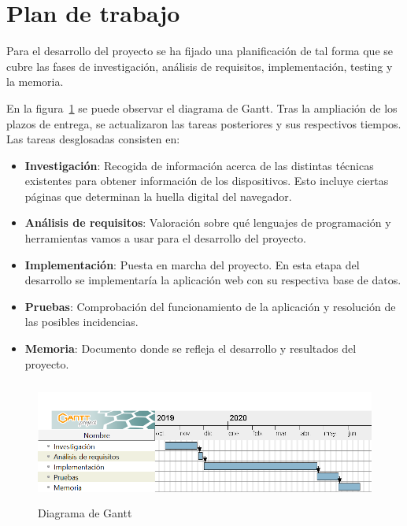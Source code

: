 \section{Plan de trabajo}
Para el desarrollo del proyecto se ha fijado una planificación de tal forma que se cubre las fases de investigación, análisis de requisitos, implementación, testing y la memoria.\par
En la figura~\ref{fig:diagramaGantt} se puede observar el diagrama de Gantt. Tras la ampliación de los plazos de entrega, se actualizaron las tareas posteriores y sus respectivos tiempos. Las tareas desglosadas consisten en:
\begin{itemize}
    \item \textbf{Investigación}: Recogida de información acerca de las distintas técnicas existentes para obtener información de los dispositivos. Esto incluye ciertas páginas que determinan la huella digital del navegador\cite{amiunique}.
    \item \textbf{Análisis de requisitos}: Valoración sobre qué lenguajes de programación y herramientas vamos a usar para el desarrollo del proyecto.
    \item \textbf{Implementación}: Puesta en marcha del proyecto. En esta etapa del desarrollo se implementaría la aplicación web con su respectiva base de datos.
    \item \textbf{Pruebas}: Comprobación del funcionamiento de la aplicación y resolución de las posibles incidencias.
    \item \textbf{Memoria}: Documento donde se refleja el desarrollo y resultados del proyecto.
\end{itemize}
\begin{figure}[b]
    \includegraphics[width=1\textwidth, height=4cm]{Images/diagramaGantt.png}
    \caption{Diagrama de Gantt}
    \label{fig:diagramaGantt}
\end{figure}

